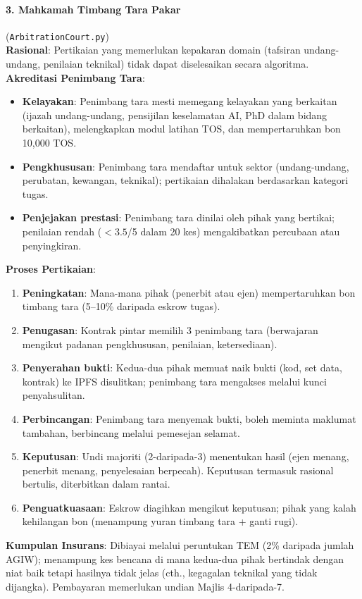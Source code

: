 \documentclass[11pt]{article}
\begin{document}
\paragraph{3. Mahkamah Timbang Tara Pakar} (\texttt{ArbitrationCourt.py})\\
\textbf{Rasional}: Pertikaian yang memerlukan kepakaran domain (tafsiran undang-undang, penilaian teknikal) tidak dapat diselesaikan secara algoritma.\\
\textbf{Akreditasi Penimbang Tara}:
\begin{itemize}[noitemsep]
  \item \textbf{Kelayakan}: Penimbang tara mesti memegang kelayakan yang berkaitan (ijazah undang-undang, pensijilan keselamatan AI, PhD dalam bidang berkaitan), melengkapkan modul latihan TOS, dan mempertaruhkan bon 10,000 TOS.
  \item \textbf{Pengkhususan}: Penimbang tara mendaftar untuk sektor (undang-undang, perubatan, kewangan, teknikal); pertikaian dihalakan berdasarkan kategori tugas.
  \item \textbf{Penjejakan prestasi}: Penimbang tara dinilai oleh pihak yang bertikai; penilaian rendah ($<3.5$/5 dalam 20 kes) mengakibatkan percubaan atau penyingkiran.
\end{itemize}
\textbf{Proses Pertikaian}:
\begin{enumerate}[noitemsep]
  \item \textbf{Peningkatan}: Mana-mana pihak (penerbit atau ejen) mempertaruhkan bon timbang tara (5--10\% daripada eskrow tugas).
  \item \textbf{Penugasan}: Kontrak pintar memilih 3 penimbang tara (berwajaran mengikut padanan pengkhususan, penilaian, ketersediaan).
  \item \textbf{Penyerahan bukti}: Kedua-dua pihak memuat naik bukti (kod, set data, kontrak) ke IPFS disulitkan; penimbang tara mengakses melalui kunci penyahsulitan.
  \item \textbf{Perbincangan}: Penimbang tara menyemak bukti, boleh meminta maklumat tambahan, berbincang melalui pemesejan selamat.
  \item \textbf{Keputusan}: Undi majoriti (2-daripada-3) menentukan hasil (ejen menang, penerbit menang, penyelesaian berpecah). Keputusan termasuk rasional bertulis, diterbitkan dalam rantai.
  \item \textbf{Penguatkuasaan}: Eskrow diagihkan mengikut keputusan; pihak yang kalah kehilangan bon (menampung yuran timbang tara + ganti rugi).
\end{enumerate}
\textbf{Kumpulan Insurans}: Dibiayai melalui peruntukan TEM (2\% daripada jumlah AGIW); menampung kes bencana di mana kedua-dua pihak bertindak dengan niat baik tetapi hasilnya tidak jelas (cth., kegagalan teknikal yang tidak dijangka). Pembayaran memerlukan undian Majlis 4-daripada-7.
\end{document}
